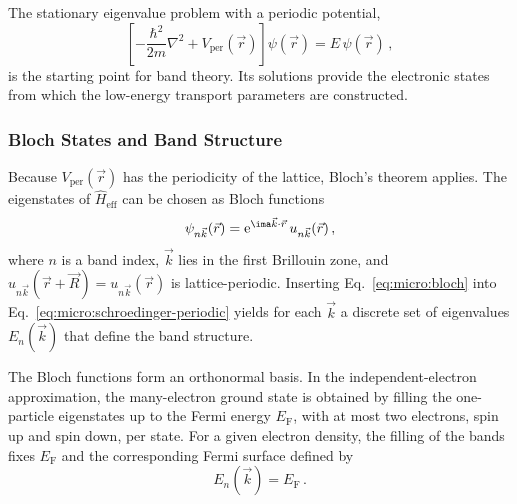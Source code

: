             The stationary eigenvalue problem with a periodic potential,
            \begin{equation}
                \left[
                    -\frac{\hbar^2}{2m}\nabla^2 + V_\text{per}(\vec{r})
                \right] \psi(\vec{r})
                = E\,\psi(\vec{r})\,,
                \label{eq:micro:schroedinger-periodic}
            \end{equation}
            is the starting point for band theory. Its solutions provide the electronic states from which the low-energy transport parameters are constructed. \cite{born_zur_1927, ashcroft_solid_2012,bloch_uber_1929}

        \subsubsection*{Bloch States and Band Structure}

            Because $V_\text{per}(\vec{r})$ has the periodicity of the lattice, Bloch's theorem applies. The eigenstates of $\hat{H}_\text{eff}$ can be chosen as Bloch functions
            \begin{equation}
                \psi_{n\vec{k}}(\vec{r})
                = \mathrm{e}^{\ima\vec{k}\cdot\vec{r}}\,
                u_{n\vec{k}}(\vec{r})\,,
                \label{eq:micro:bloch}
            \end{equation}
            where $n$ is a band index, $\vec{k}$ lies in the first Brillouin zone, and $u_{n\vec{k}}(\vec{r}+\vec{R}) = u_{n\vec{k}}(\vec{r})$ is lattice-periodic. Inserting Eq.~\eqref{eq:micro:bloch} into Eq.~\eqref{eq:micro:schroedinger-periodic} yields for each $\vec{k}$ a discrete set of eigenvalues $E_n(\vec{k})$ that define the band structure.

            The Bloch functions form an orthonormal basis. In the independent-electron approximation, the many-electron ground state is obtained by filling the one-particle eigenstates up to the Fermi energy $E_\mathrm{F}$, with at most two electrons, spin up and spin down, per state. For a given electron density, the filling of the bands fixes $E_\mathrm{F}$ and the corresponding Fermi surface defined by
            \begin{equation}
                E_n(\vec{k}) = E_\mathrm{F}\,.
                \label{eq:basics:fermi-surface}
            \end{equation}


